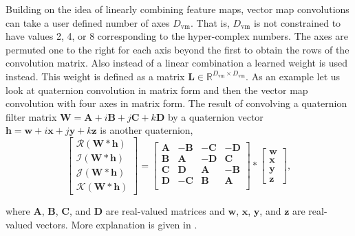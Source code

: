 \documentclass[14pt,a4paper]{article}
\begin{document}
Building on the idea of linearly combining feature maps, vector map convolutions can take a user defined number of axes $D_\mathrm{vm}$.
That is, $D_\mathrm{vm}$ is not constrained to have values 2, 4, or 8 corresponding to the hyper-complex numbers.
The axes are permuted one to the right for each axis beyond the first to obtain the rows of the convolution matrix.
Also instead of a linear combination a learned weight is used instead.
This weight is defined as a matrix $\textbf{L} \in \mathbb{R}^{D_\mathrm{vm}\times D_\mathrm{vm}}$.
As an example let us look at quaternion convolution in matrix form and then the vector map convolution with four axes in matrix form.
The result of convolving a quaternion filter matrix $\textbf{W}=\textbf{A}+\textit{i}\textbf{B}+\textit{j}\textbf{C}+\textit{k}\textbf{D}$ by a quaternion vector $\textbf{h}=\textbf{w}+\textit{i}\textbf{x}+\textit{j}\textbf{y}+\textit{k}\textbf{z}$ is another quaternion,
\begin{equation}
\begin{bmatrix}
 \mathscr{R}(\textbf{W}\ast \textbf{h}) \\ 
 \mathscr{I}(\textbf{W}\ast \textbf{h}) \\
 \mathscr{J}(\textbf{W}\ast \textbf{h}) \\
 \mathscr{K}(\textbf{W}\ast \textbf{h}) 
\end{bmatrix}
=
\begin{bmatrix}
 \textbf{A} & -\textbf{B} & -\textbf{C} & -\textbf{D} \\
 \textbf{B} & \textbf{A} & -\textbf{D} & \textbf{C} \\
 \textbf{C} & \textbf{D} & \textbf{A} & -\textbf{B} \\
 \textbf{D} & -\textbf{C} & \textbf{B} & \textbf{A} \\
\end{bmatrix}
\ast
\begin{bmatrix}
 \textbf{w} \\ 
 \textbf{x} \\
 \textbf{y} \\
 \textbf{z}
\end{bmatrix} ,
\label{e:quatconv}
\end{equation}

\noindent
where $\mathbf{A}$, $\mathbf{B}$, $\mathbf{C}$, and $\mathbf{D}$ are real-valued matrices and 
$\mathbf{w}$, $\mathbf{x}$, $\mathbf{y}$, and $\mathbf{z}$ are real-valued vectors.
More explanation is given in \cite{Gaudet2018}.
\end{document}
